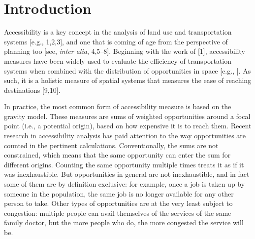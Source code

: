\documentclass[10pt,letterpaper]{article}
\begin{document}

\linenumbers

\hypertarget{introduction}{%
\section{Introduction}\label{introduction}}

Accessibility is a key concept in the analysis of land use and
transportation systems {[}e.g., 1,2,3{]}, and one that is coming of age
from the perspective of planning too {[}see, \emph{inter alia},
4,5--8{]}. Beginning with the work of {[}1{]}, accessibility measures
have been widely used to evaluate the efficiency of transportation
systems when combined with the distribution of opportunities in space
{[}e.g., {]}. As such, it is a holistic measure of spatial systems that
measures the ease of reaching destinations {[}9,10{]}.

In practice, the most common form of accessibility measure is based on
the gravity model. These measures are sums of weighted opportunities
around a focal point (i.e., a potential origin), based on how expensive
it is to reach them. Recent research in accessibility analysis has paid
attention to the way opportunities are counted in the pertinent
calculations. Conventionally, the sums are not constrained, which means
that the same opportunity can enter the sum for different origins.
Counting the same opportunity multiple times treats it as if it was
inexhaustible. But opportunities in general are not inexhaustible, and
in fact some of them are by definition exclusive: for example, once a
job is taken up by someone in the population, the same job is no longer
available for any other person to take. Other types of opportunities are
at the very least subject to congestion: multiple people can avail
themselves of the services of the same family doctor, but the more
people who do, the more congested the service will be.
\end{document}
